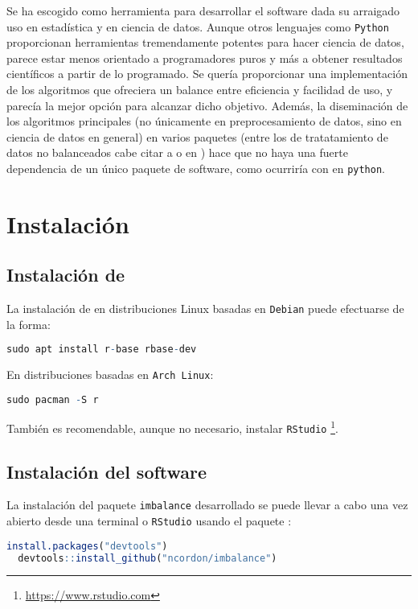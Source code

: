 Se ha escogido \R como herramienta para desarrollar el software dada su arraigado uso en estadística y en ciencia
de datos. Aunque otros lenguajes como \texttt{Python} proporcionan herramientas tremendamente potentes para
hacer ciencia de datos, \R parece estar menos orientado a programadores puros y más a obtener resultados
científicos a partir de lo programado. Se quería proporcionar una implementación de los algoritmos que 
ofreciera un balance entre eficiencia y facilidad de uso, y \R parecía la mejor opción para alcanzar dicho
objetivo. Además, la diseminación de los algoritmos principales (no únicamente en preprocesamiento de datos,
sino en ciencia de datos en general) en varios paquetes (entre los de tratatamiento de datos no balanceados cabe
citar a  o  en \R) hace que no haya una fuerte dependencia de un 
único paquete de software, como ocurriría con  en \texttt{python}.

\section{Instalación}
\subsection{Instalación de \R}
La instalación de \R en distribuciones Linux basadas en \texttt{Debian} puede efectuarse de la forma:
  \begin{lstlisting}[language=R,numbers=none]
  sudo apt install r-base rbase-dev
  \end{lstlisting}

En distribuciones basadas en \texttt{Arch Linux}:
  \begin{lstlisting}[language=R,numbers=none]
  sudo pacman -S r
  \end{lstlisting}

También es recomendable, aunque no necesario, instalar \texttt{RStudio} \footnote{\url{https://www.rstudio.com}}.

\subsection{Instalación del software}
La instalación del paquete \texttt{imbalance} desarrollado se puede llevar a cabo una vez abierto desde 
una terminal \R o \texttt{RStudio} usando el paquete :
  \begin{lstlisting}[language=R,numbers=none]
  install.packages("devtools")
  devtools::install_github("ncordon/imbalance")
  \end{lstlisting}

